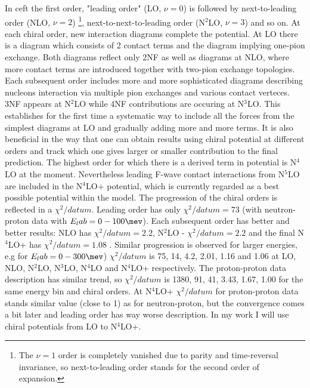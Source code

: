 In \gls{ceft} the first order, "leading order" (LO, $\nu=0$) is followed 
by next-to-leading order (NLO, $\nu=2$)
\footnote{The $\nu=1$ order is completely vanished due to parity and time-reversal invariance,
so next-to-leading order stands for the second order of expansion.},
 next-to-next-to-leading order (N$^2$LO, $\nu=3$) and so on.
 At each chiral order, new interaction diagrams complete the potential.
 At LO there is a diagram which consists of 2 contact terms and the diagram
 implying one-pion exchange. Both diagrams reflect only 2NF as well
 as diagrams at NLO, where more contact terms are introduced together with two-pion 
 exchange topologies. Each subsequent order includes more and more sophisticated diagrams
 describing nucleons interaction
 via multiple  pion exchanges and various contact verteces.
 3NF appears at N$^2$LO while 4NF contributions are occuring at N$^3$LO.
 This establishes for the first time a systematic
way to include all the forces from the simplest diagrams at LO and gradually
adding more and more terms. 
It is also beneficial in the way that 
one can obtain results using chiral potential at different
orders and track which one gives larger or smaller contribution to the final prediction.
The highest order for which there is a derived term in potential
is N$^4$LO at the moment. Nevertheless leading F-wave contact interactions from N$^5$LO are included in the N$^4$LO+ potential,
which is currently regarded as a best possible potential within the model.
The progression of the chiral orders is reflected in a $\chi^2/datum$.
Leading order has only $\chi^2/datum = 73$ (with neutron-proton data with $E_lab = 0-100 \unit{\mev}$).
Each subsequent order has better and better results: NLO has $\chi^2/datum = 2.2$, N$^2$LO - $\chi^2/datum = 2.2$
and the final N$^4$LO+ has $\chi^2/datum = 1.08$ \cite{reinkrebs2018}.
Similar progression is observed for larger energies, e.g for $E_lab = 0-300 \unit{\mev}$)
$\chi^2/datum$ is 75, 14, 4.2, 2.01, 1.16 and 1.06 at LO, NLO, N$^2$LO, N$^3$LO, N$^4$LO and N$^4$LO+ respectively.
The proton-proton data description has similar trend, so $\chi^2/datum$ is 1380, 91, 41, 3.43, 1.67, 1.00 
for the same energy bin and chiral orders. At N$^4$LO+ $\chi^2/datum$ for proton-proton data
stands similar value (close to 1) as for neutron-proton, but the convergence comes a bit later and 
leading order has way worse description.
In my work I will use chiral potentials from LO to N$^4$LO+.

